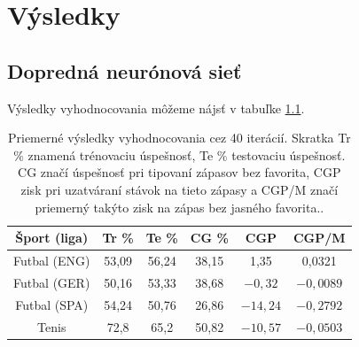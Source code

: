\chapter{Výsledky} \label{res}
\section{Dopredná neurónová sieť}
Výsledky vyhodnocovania môžeme nájsť v tabuľke \ref{res_fnn}.

\begin{table}[h]
\begin{center}
\begin{tabular}{ c|c|c|c|c|c| } 
 
 Šport (liga) & Tr \% &  Te \% & CG \% & CGP & CGP/M \\ 
 \hline
 Futbal (ENG) & 53,09 & 56,24 & 38,15 & 1,35 & 0,0321 \\ 
 Futbal (GER) & 50,16 & 53,33 & 38,68 & $-0,32$ & $-0,0089$ \\ 
 Futbal (SPA) & 54,24 & 50,76 & 26,86 & $-14,24$ & $-0,2792$ \\ 
 Tenis & 72,8 & 65,2 & 50,82 & $-10,57$ & $-0,0503$ \\ 
 \hline
\end{tabular}
\caption{Priemerné výsledky vyhodnocovania cez 40 iterácií. Skratka Tr \% znamená trénovaciu úspešnosť, Te \% testovaciu úspešnosť. CG značí úspešnosť pri tipovaní zápasov bez favorita, CGP zisk pri uzatváraní stávok na tieto zápasy a CGP/M značí priemerný takýto zisk na zápas bez jasného favorita..}
\label{res_fnn}
\end{center}
\end{table}

